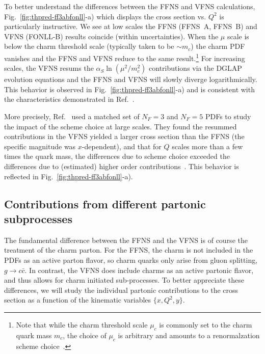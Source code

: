\documentclass[pdftex,twocolumn,epjc3]{svjour3}          %
\newcommand{\fonll} {{FONLL-B}\xspace}
\newcommand{\ffns} {{FFNS~A}\xspace}
\newcommand{\ffnsb} {{FFNS~B}\xspace}
\begin{document}
%
To better understand the differences between the FFNS and VFNS
calculations, Fig.~\ref{fig:thpred-ff3abfonll}-a) which displays the
cross section vs. $Q^2$ is particularly instructive.
%
We see at low scales the FFNS (\ffns, \ffnsb) and VFNS (\fonll)
results coincide (within uncertainties).  When the $\mu$ scale is
below the charm threshold scale (typically taken to be $\sim m_c$) the
charm PDF vanishes and the FFNS and VFNS reduce to the same
result.\footnote{Note that while the charm threshold scale $\mu_c$ is
  commonly set to the charm quark mass $m_c$, the choice of $\mu_c$ is
  arbitrary and amounts to a renormalzation scheme
  choice~\cite{Bertone:2017ehk}.  }
%
For increasing scales, the VFNS resums the $\alpha_S \ln(\mu^2/m_c^2)$
contributions via the DGLAP evolution equations and the FFNS and VFNS
will slowly diverge logarithmically.  This behavior is observed in
Fig.~\ref{fig:thpred-ff3abfonll}-a) and is consistent with the
characteristics demonstrated in Ref.~\cite{Kusina:2013slm}.

More precisely, Ref.~\cite{Kusina:2013slm} used a matched set of
$N_F=3$ and $N_F=5$ PDFs to study the impact of the scheme choice at
large scales. They found the resummed contributions in the VFNS
yielded a larger cross section than the FFNS (the specific magnitude
was $x$-dependent), and that for $Q$ scales more than a few times the
quark mass, the differences due to scheme choice exceeded the
differences due to (estimated) higher order
contributions~\cite{Kusina:2013slm}.
%
This behavior is reflected in Fig.~\ref{fig:thpred-ff3abfonll}-a).




\subsection{Contributions from different partonic subprocesses}
\label{sec:thpred-partonic}



The fundamental difference between the FFNS and the VFNS is of course the treatment  of the charm parton.
For the FFNS, the charm is not included in the PDFs as an active parton flavor, so
charm quarks only arise from gluon splitting, $g\to c \bar{c}$.
In contrast, the VFNS does include charms as an active partonic flavor, and thus
allows for charm initiated sub-processes.
%
To better appreciate these differences, we will study the individual partonic contributions
to the cross section as a function of the kinematic variables  $\{x, Q^2, y\}$.
\end{document}
